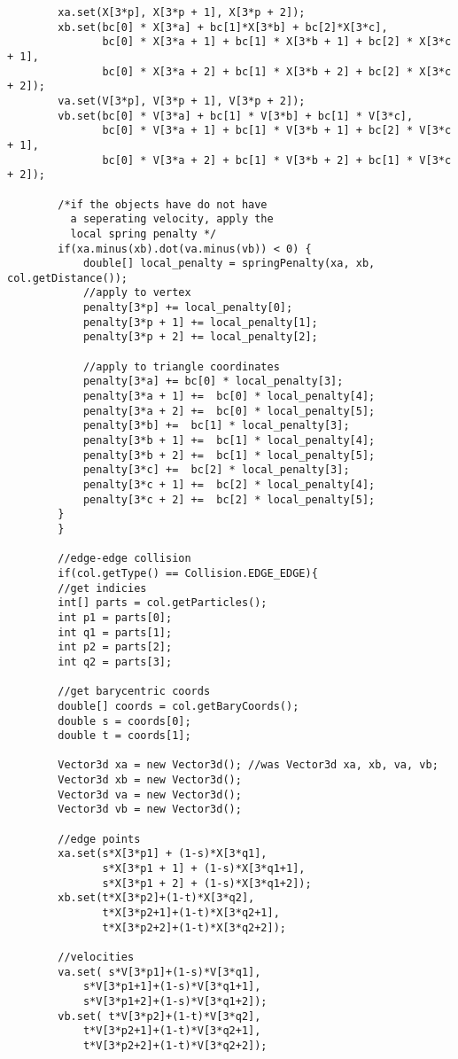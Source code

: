 \begin{lstlisting}
		xa.set(X[3*p], X[3*p + 1], X[3*p + 2]);
		xb.set(bc[0] * X[3*a] + bc[1]*X[3*b] + bc[2]*X[3*c],
		       bc[0] * X[3*a + 1] + bc[1] * X[3*b + 1] + bc[2] * X[3*c + 1],
		       bc[0] * X[3*a + 2] + bc[1] * X[3*b + 2] + bc[2] * X[3*c + 2]);
		va.set(V[3*p], V[3*p + 1], V[3*p + 2]);
		vb.set(bc[0] * V[3*a] + bc[1] * V[3*b] + bc[1] * V[3*c],
		       bc[0] * V[3*a + 1] + bc[1] * V[3*b + 1] + bc[2] * V[3*c + 1],
		       bc[0] * V[3*a + 2] + bc[1] * V[3*b + 2] + bc[1] * V[3*c + 2]);

		/*if the objects have do not have
		  a seperating velocity, apply the 
		  local spring penalty */
		if(xa.minus(xb).dot(va.minus(vb)) < 0) {
		    double[] local_penalty = springPenalty(xa, xb, col.getDistance());
		    //apply to vertex
		    penalty[3*p] += local_penalty[0];
		    penalty[3*p + 1] += local_penalty[1];
		    penalty[3*p + 2] += local_penalty[2];

		    //apply to triangle coordinates
		    penalty[3*a] += bc[0] * local_penalty[3];
		    penalty[3*a + 1] +=  bc[0] * local_penalty[4];
		    penalty[3*a + 2] +=  bc[0] * local_penalty[5];
		    penalty[3*b] +=  bc[1] * local_penalty[3];
		    penalty[3*b + 1] +=  bc[1] * local_penalty[4];
		    penalty[3*b + 2] +=  bc[1] * local_penalty[5];
		    penalty[3*c] +=  bc[2] * local_penalty[3];
		    penalty[3*c + 1] +=  bc[2] * local_penalty[4];
		    penalty[3*c + 2] +=  bc[2] * local_penalty[5];
		}
	    }
		
	    //edge-edge collision
	    if(col.getType() == Collision.EDGE_EDGE){
		//get indicies
		int[] parts = col.getParticles();
		int p1 = parts[0];
		int q1 = parts[1];
		int p2 = parts[2];
		int q2 = parts[3];

		//get barycentric coords
		double[] coords = col.getBaryCoords();
		double s = coords[0];
		double t = coords[1];

		Vector3d xa = new Vector3d(); //was Vector3d xa, xb, va, vb;
		Vector3d xb = new Vector3d();
		Vector3d va = new Vector3d();
		Vector3d vb = new Vector3d();

		//edge points
		xa.set(s*X[3*p1] + (1-s)*X[3*q1],
		       s*X[3*p1 + 1] + (1-s)*X[3*q1+1],
		       s*X[3*p1 + 2] + (1-s)*X[3*q1+2]);
		xb.set(t*X[3*p2]+(1-t)*X[3*q2],
		       t*X[3*p2+1]+(1-t)*X[3*q2+1],
		       t*X[3*p2+2]+(1-t)*X[3*q2+2]);

		//velocities
		va.set(	s*V[3*p1]+(1-s)*V[3*q1],
			s*V[3*p1+1]+(1-s)*V[3*q1+1],
			s*V[3*p1+2]+(1-s)*V[3*q1+2]);
		vb.set(	t*V[3*p2]+(1-t)*V[3*q2],
			t*V[3*p2+1]+(1-t)*V[3*q2+1],
			t*V[3*p2+2]+(1-t)*V[3*q2+2]);


\end{lstlisting}
